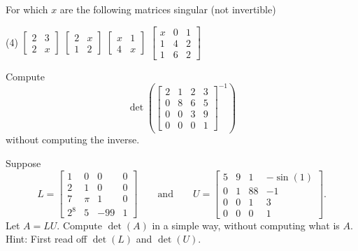 \begin{exercise}
\pagebreak[2]
For which $x$ are the following matrices singular (not invertible)
\begin{tasks}(4)
\task
$\begin{bmatrix}
2 & 3 \\
2 & x
\end{bmatrix}$
\task
$\begin{bmatrix}
2 & x \\
1 & 2
\end{bmatrix}$
\task
$\begin{bmatrix}
x & 1 \\
4 & x
\end{bmatrix}$
\task
$\begin{bmatrix}
x & 0 & 1 \\
1 & 4 & 2 \\
1 & 6 & 2
\end{bmatrix}$
\end{tasks}
\end{exercise}

\begin{exercise}
Compute
\begin{equation*}
\det \left( \begin{bmatrix}
2 & 1 & 2 & 3 \\
0 & 8 & 6 & 5 \\
0 & 0 & 3 & 9 \\
0 & 0 & 0 & 1
\end{bmatrix}^{-1}
\right)
\end{equation*}
without computing the inverse.
\end{exercise}

\begin{exercise}
Suppose
\begin{equation*}
L = \begin{bmatrix}
1 & 0 & 0 & 0 \\
2 & 1 & 0 & 0 \\
7 & \pi & 1 & 0 \\
2^8 & 5 & -99 & 1
\end{bmatrix}
\qquad \text{and} \qquad
U = \begin{bmatrix}
5 & 9 & 1 & -\sin(1) \\
0 & 1 & 88 & -1 \\
0 & 0 & 1 & 3 \\
0 & 0 & 0 & 1
\end{bmatrix} .
\end{equation*}
Let $A = LU$.  Compute $\det(A)$ in a simple way, without computing what is $A$.
Hint: First read off $\det(L)$ and $\det(U)$.
\end{exercise}

